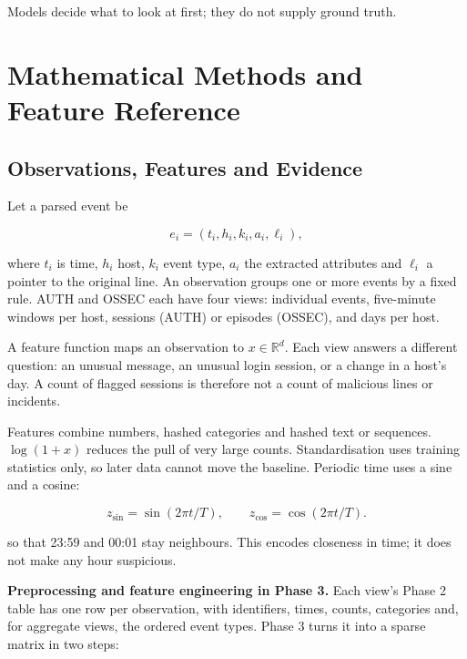 \documentclass[11pt,a4paper]{article}
\begin{document}
Models decide what to look at first; they do not supply ground truth.

\clearpage
\section{Mathematical Methods and Feature Reference}
\label{app:methods}

\subsection{Observations, Features and Evidence}

Let a parsed event be

\begin{equation}
\label{eq:1}
e_i=(t_i,h_i,k_i,a_i,\ell_i),
\end{equation}

where \(t_i\) is time, \(h_i\) host, \(k_i\) event type, \(a_i\) the extracted attributes and \(\ell_i\) a pointer to the original line. An observation groups one or more events by a fixed rule. AUTH and OSSEC each have four views: individual events, five-minute windows per host, sessions (AUTH) or episodes (OSSEC), and days per host.

A feature function maps an observation to \(x\in\mathbb{R}^d\). Each view answers a different question: an unusual message, an unusual login session, or a change in a host's day. A count of flagged sessions is therefore not a count of malicious lines or incidents.

Features combine numbers, hashed categories and hashed text or sequences. \(\log(1+x)\) reduces the pull of very large counts. Standardisation uses training statistics only, so later data cannot move the baseline. Periodic time uses a sine and a cosine:

\begin{equation}
\label{eq:2}
z_{\sin}=\sin(2\pi t/T),\qquad z_{\cos}=\cos(2\pi t/T).
\end{equation}

so that 23:59 and 00:01 stay neighbours. This encodes closeness in time; it does not make any hour suspicious.

\textbf{Preprocessing and feature engineering in Phase 3.} Each view's Phase 2 table has one row per observation, with identifiers, times, counts, categories and, for aggregate views, the ordered event types. Phase 3 turns it into a sparse matrix in two steps:
\end{document}
